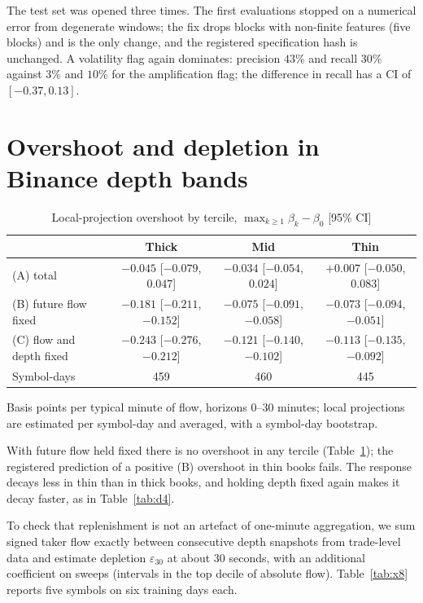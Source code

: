 \documentclass[12pt]{article}
\theoremstyle{definition}
\theoremstyle{remark}
\begin{document}
The test set was opened three times. The first evaluations stopped on a numerical error from degenerate windows; the fix drops blocks with non-finite features (five blocks) and is the only change, and the registered specification hash is unchanged. A volatility flag again dominates: precision $43\%$ and recall $30\%$ against $3\%$ and $10\%$ for the amplification flag; the difference in recall has a CI of $[-0.37,0.13]$.

\section{Overshoot and depletion in Binance depth bands}

\begin{table}[t]\centering\small
\begin{threeparttable}
\caption{Local-projection overshoot by tercile, $\max_{k\ge1}\beta_k-\beta_0$ [95\% CI]}\label{tab:x4}
\setlength{\tabcolsep}{3pt}
\begin{tabular}{lccc}
\toprule
 & Thick & Mid & Thin\\
\midrule
(A) total & $-0.045$ [$-0.079$, $0.047$] & $-0.034$ [$-0.054$, $0.024$] & $+0.007$ [$-0.050$, $0.083$]\\
(B) future flow fixed & $-0.181$ [$-0.211$, $-0.152$] & $-0.075$ [$-0.091$, $-0.058$] & $-0.073$ [$-0.094$, $-0.051$]\\
(C) flow and depth fixed & $-0.243$ [$-0.276$, $-0.212$] & $-0.121$ [$-0.140$, $-0.102$] & $-0.113$ [$-0.135$, $-0.092$]\\
Symbol-days & 459 & 460 & 445\\
\bottomrule
\end{tabular}
\begin{tablenotes}\footnotesize\item Basis points per typical minute of flow, horizons 0--30 minutes; local projections are estimated per symbol-day and averaged, with a symbol-day bootstrap. \end{tablenotes}
\end{threeparttable}
\end{table}

With future flow held fixed there is no overshoot in any tercile (Table~\ref{tab:x4}); the registered prediction of a positive (B) overshoot in thin books fails. The response decays less in thin than in thick books, and holding depth fixed again makes it decay faster, as in Table~\ref{tab:d4}.

To check that replenishment is not an artefact of one-minute aggregation, we sum signed taker flow exactly between consecutive depth snapshots from trade-level data and estimate depletion $\varepsilon_{30}$ at about 30 seconds, with an additional coefficient on sweeps (intervals in the top decile of absolute flow). Table~\ref{tab:x8} reports five symbols on six training days each.
\end{document}
